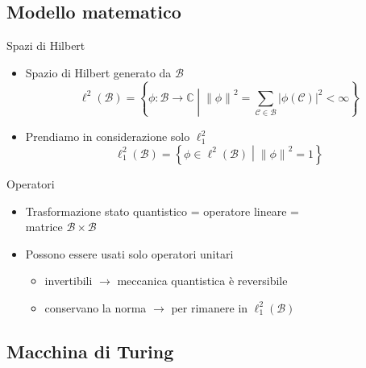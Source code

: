 \documentclass{beamer}
\newcommand{\spacedmiddle}[1]{\mathrel{}\middle#1\mathrel{}}
\newcommand{\hil}{\ell^{2}}
\newcommand{\hiluninorm}{\hil_{1}}
\begin{document}
\subsection{Modello matematico}

\begin{frame}{\subsecname}{Spazi di Hilbert}
	\begin{itemize}
		\item<+-> \alert{Spazio di Hilbert} generato da \( \mathcal{B} \)
		\[ \hil \left ( \mathcal{B} \right ) = \left \{ \phi : \mathcal{B} \rightarrow \mathbb{C} \spacedmiddle | \left \| \phi \right \|^{2} = \sum_{\mathcal{C} \in \mathcal{B}} \left | \phi \left ( \mathcal{C} \right ) \right |^{2} < \infty \right \}\]
		\item<+-> Prendiamo in considerazione solo \(\hiluninorm\)
		\[ \hiluninorm \left ( \mathcal{B} \right ) = \left \{ \phi \in \hil \left ( \mathcal{B} \right ) \spacedmiddle | \left \| \phi \right \|^{2} = 1 \right \}\]
	\end{itemize}
\end{frame}

\begin{frame}{\subsecname}{Operatori}
	\begin{itemize}
		\item<+-> Trasformazione stato quantistico = operatore lineare = \\
		matrice \( \mathcal{B} \times \mathcal{B} \)
		\item<+-> Possono essere usati solo \alert{operatori unitari}
		\begin{itemize}
			\item invertibili \(\rightarrow\) meccanica quantistica è reversibile
			\item conservano la norma \(\rightarrow\) per rimanere in \(\hiluninorm \left ( \mathcal{B} \right )\)
		\end{itemize}
	\end{itemize}
\end{frame}

\subsection{Macchina di Turing}
\end{document}
